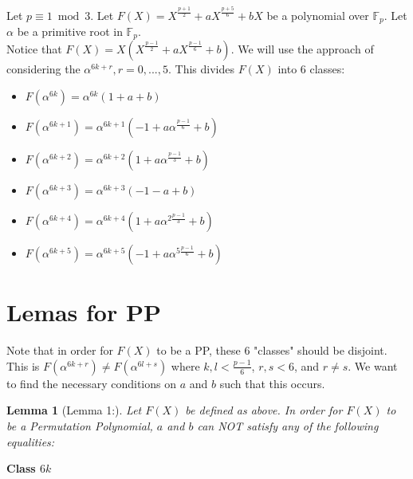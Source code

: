 \documentclass[12pt]{article}
\newtheorem{lemma}{Lemma}
\begin{document}
Let $p \equiv 1 \bmod{3}$. Let $F(X)=X^{\frac{p+1}{2}}+aX^{\frac{p+5}{6}}+bX$ be a polynomial over $\mathbb{F}_{p}$. Let $\alpha$ be a primitive root in $\mathbb{F}_{p}$.
\\
Notice that $F(X)=X(X^{\frac{p-1}{2}}+aX^{\frac{p-1}{6}}+b)$. We will use the approach of considering the $\alpha^{6k+r},r=0,...,5$. This divides $F(X)$ into 6 classes:

\begin{itemize}
	\item
		$F(\alpha^{6k}) = \alpha^{6k}(1+a+b)$
	\item
		$F(\alpha^{6k+1})= \alpha^{6k+1}(-1+a\alpha^{\frac{p-1}{6}}+b)$
	\item
		$F(\alpha^{6k+2})=\alpha^{6k+2}(1+a\alpha^{\frac{p-1}{3}}+b)$
	\item
		$F(\alpha^{6k+3})=\alpha^{6k+3}(-1-a+b)$
	\item
		$F(\alpha^{6k+4})=\alpha^{6k+4}(1+a\alpha^{2\frac{p-1}{3}}+b)$
	\item
		$F(\alpha^{6k+5})=\alpha^{6k+5}(-1+a\alpha^{5\frac{p-1}{6}}+b)$
\end{itemize}

\section{Lemas for PP} %
\label{sec:lemas_for_pp}
Note that in order for $F(X)$ to be a PP, these 6 "classes" should be disjoint. This is $F(\alpha^{6k+r}) \neq F(\alpha^{6l+s})$ where $k,l < \frac{p-1}{6}$, $r,s < 6$, and $r \neq s$. We want to find the necessary conditions on $a$ and $b$ such that this occurs.

\begin{lemma}[Lemma 1:]
	Let $F(X)$ be defined as above. In order for $F(X)$ to be a Permutation Polynomial, $a$ and $b$ can NOT satisfy any of the following equalities:
\end{lemma}

\textbf{Class $6k$}
\end{document}
